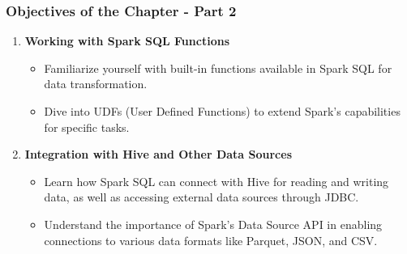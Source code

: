 \documentclass[aspectratio=169]{beamer}
\begin{document}
\begin{frame}[fragile]
    \frametitle{Objectives of the Chapter - Part 2}
    \begin{enumerate}[resume]
        \item \textbf{Working with Spark SQL Functions}
        \begin{itemize}
            \item Familiarize yourself with built-in functions available in Spark SQL for data transformation.
            \item Dive into UDFs (User Defined Functions) to extend Spark’s capabilities for specific tasks.
        \end{itemize}

        \item \textbf{Integration with Hive and Other Data Sources}
        \begin{itemize}
            \item Learn how Spark SQL can connect with Hive for reading and writing data, as well as accessing external data sources through JDBC.
            \item Understand the importance of Spark’s Data Source API in enabling connections to various data formats like Parquet, JSON, and CSV.
        \end{itemize}
    \end{enumerate}
\end{frame}
\end{document}
